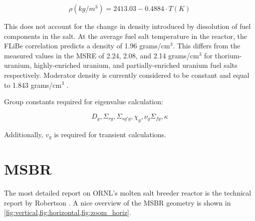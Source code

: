 \documentclass{article}
\let\Oldsection\section
\renewcommand{\section}{\FloatBarrier\Oldsection}
\begin{document}
\begin{equation}
  \label{eq:flibe_density}
  \rho(kg/m^3) = 2413.03-0.4884\cdot T(K)
\end{equation}

This does not account for the change in density introduced by dissolution of
fuel components in the salt. At the average fuel salt temperature in the
reactor, the \gls{FLiBe} correlation predicts a density of 1.96
grams/cm$^3$. This differs from the measured values in the \gls{MSRE} of 2.24,
2.08, and 2.14 grams/cm$^3$ for thorium-uranium, highly-enriched uranium, and
partially-enriched uranium fuel salts respectively. Moderator density is
currently considered to be constant and equal to 1.843 grams/cm$^3$
\cite{cammi_multi-physics_2011}.

Group constants required for eigenvalue calculation:

\begin{equation}
  \label{eq:constants}
  D_g,\Sigma_{rg},\Sigma_{sg'g},\chi_g,\nu_g\Sigma_{fg},\kappa
\end{equation}

Additionally, $v_g$ is required for transient calculations.

\section{MSBR}

The most detailed report on \gls{ORNL}'s molten salt breeder reactor is the technical
report by Robertson \cite{robertson_conceptual_1971}. A nice overview of the
MSBR geometry is shown in \cref{fig:vertical,fig:horizontal,fig:zoom_horiz}.
\end{document}
